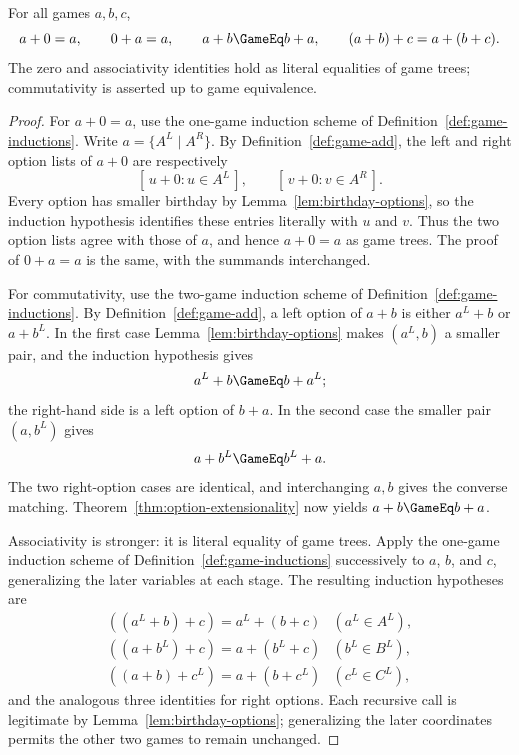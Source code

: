 \begin{theorem}
  \label{thm:game-add-laws}
  \leanok
  For all games \(a,b,c\),
  \[
    a+0=a,\qquad 0+a=a,\qquad a+b\GameEq b+a,
    \qquad (a+b)+c=a+(b+c).
  \]
  The zero and associativity identities hold as literal equalities of game trees; commutativity
  is asserted up to game equivalence.
\end{theorem}
\begin{proof}
  \leanok
  For \(a+0=a\), use the one-game induction scheme of
  Definition~\ref{def:game-inductions}.  Write \(a=\{A^L\mid A^R\}\).  By
  Definition~\ref{def:game-add}, the left and right option lists of \(a+0\)
  are respectively
  \[
    [\,u+0:u\in A^L\,],
    \qquad
    [\,v+0:v\in A^R\,].
  \]
  Every option has smaller birthday by Lemma~\ref{lem:birthday-options}, so
  the induction hypothesis identifies these entries literally with \(u\) and
  \(v\).  Thus the two option lists agree with those of \(a\), and hence
  \(a+0=a\) as game trees.  The proof of \(0+a=a\) is the same, with the
  summands interchanged.

  For commutativity, use the two-game induction scheme of
  Definition~\ref{def:game-inductions}.  By Definition~\ref{def:game-add}, a
  left option of \(a+b\) is either \(a^L+b\) or \(a+b^L\).  In the first
  case Lemma~\ref{lem:birthday-options} makes \((a^L,b)\) a smaller pair, and
  the induction hypothesis gives
  \[
    a^L+b\GameEq b+a^L;
  \]
  the right-hand side is a left option of \(b+a\).  In the second case the
  smaller pair \((a,b^L)\) gives
  \[
    a+b^L\GameEq b^L+a.
  \]
  The two right-option cases are identical, and interchanging \(a,b\) gives
  the converse matching.  Theorem~\ref{thm:option-extensionality} now yields
  \(a+b\GameEq b+a\).

  Associativity is stronger: it is literal equality of game trees.  Apply the
  one-game induction scheme of Definition~\ref{def:game-inductions}
  successively to \(a\), \(b\), and \(c\), generalizing the later variables at
  each stage.  The resulting induction hypotheses are
  \[
    \begin{array}{ll}
      ((a^L+b)+c)=a^L+(b+c) & (a^L\in A^L),\\
      ((a+b^L)+c)=a+(b^L+c) & (b^L\in B^L),\\
      ((a+b)+c^L)=a+(b+c^L) & (c^L\in C^L),
    \end{array}
  \]
  and the analogous three identities for right options.  Each recursive call
  is legitimate by Lemma~\ref{lem:birthday-options}; generalizing the later
  coordinates permits the other two games to remain unchanged.


\end{proof}
